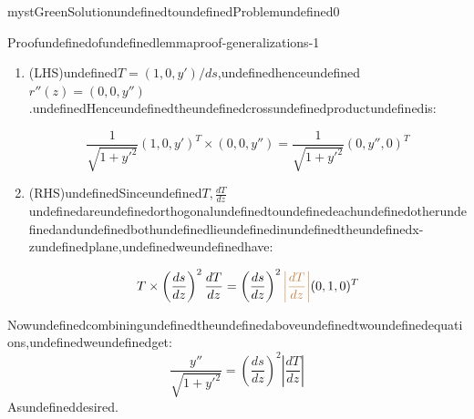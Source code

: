 \begin{mystadmonition}{mystGreen}{SolutionundefinedtoundefinedProblemundefined0}
\begin{mystthmproof}{Proofundefinedofundefinedlemma}{proof-generalizations-1}
\begin{enumerate}
\item (LHS)undefined$T=(1,0,y')/ds$,undefinedhenceundefined$r''(z) = (0,0,y'')$.undefinedHenceundefinedtheundefinedcrossundefinedproductundefinedis:

\begin{equation}
\frac{1}{\sqrt{1+y'^2}} (1,0,y')^T \times (0,0,y'')  = \frac{1}{\sqrt{1+y'^2}}(0,y'',0)^T
\end{equation}


\item (RHS)undefinedSinceundefined$T, \frac{dT}{dz}$undefinedareundefinedorthogonalundefinedtoundefinedeachundefinedotherundefinedandundefinedbothundefinedlieundefinedinundefinedtheundefinedx-zundefinedplane,undefinedweundefinedhave:

\begin{equation}
T \times \left(\frac{ds}{dz}\right)^2\frac{dT}{dz} =  \left(\frac{ds}{dz}\right)^2 \textcolor{brown}{\left|\frac{dT}{dz}\right|} (0,1,0)^T
\end{equation}
\end{enumerate}

Nowundefinedcombiningundefinedtheundefinedaboveundefinedtwoundefinedequations,undefinedweundefinedget:
\begin{equation}
\frac{y''}{\sqrt{1+y'^2}}=\left(\frac{ds}{dz}\right)^2  \left|\frac{dT}{dz}\right|
\end{equation}
Asundefineddesired.

\end{mystthmproof}
\end{mystadmonition}
